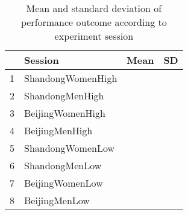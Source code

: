\begin{table}[ht]
\centering
\begin{tabular}{rlrr}
  \hline
 & Session & Mean & SD \\ 
  \hline
1 & ShandongWomenHigh &  &  \\ 
  2 & ShandongMenHigh &  &  \\ 
  3 & BeijingWomenHigh &  &  \\ 
  4 & BeijingMenHigh &  &  \\ 
  5 & ShandongWomenLow &  &  \\ 
  6 & ShandongMenLow &  &  \\ 
  7 & BeijingWomenLow &  &  \\ 
  8 & BeijingMenLow &  &  \\ 
   \hline
\end{tabular}
\caption{Mean and standard deviation of performance outcome according to experiment session} 
\label{tab:fullOutcomeAvgSdSession}
\end{table}
